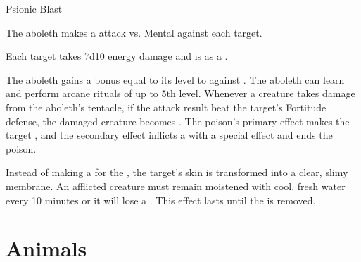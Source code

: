    \begin{freeability}{Psionic Blast}
      
      The aboleth makes a  attack
        vs. Mental against each target.
    
    \hit Each target takes 7d10 energy damage and is  as a .
    \end{freeability}
  
       The aboleth gains a bonus equal to its level to  against .
     The aboleth can learn and perform arcane rituals of up to 5th level.
        Whenever a creature takes damage from the aboleth's tentacle,
          if the attack result beat the target's Fortitude defense,
          the damaged creature becomes .
        The poison's primary effect makes the target ,
          and the secondary effect inflicts a  with a special effect and ends the poison.

        Instead of making a  for the ,
          the target's skin is transformed into a clear, slimy membrane.
        An afflicted creature must remain moistened with cool, fresh water every 10 minutes
          or it will lose a .
        This effect lasts until the  is removed.
  
        \section{Animals}
      
